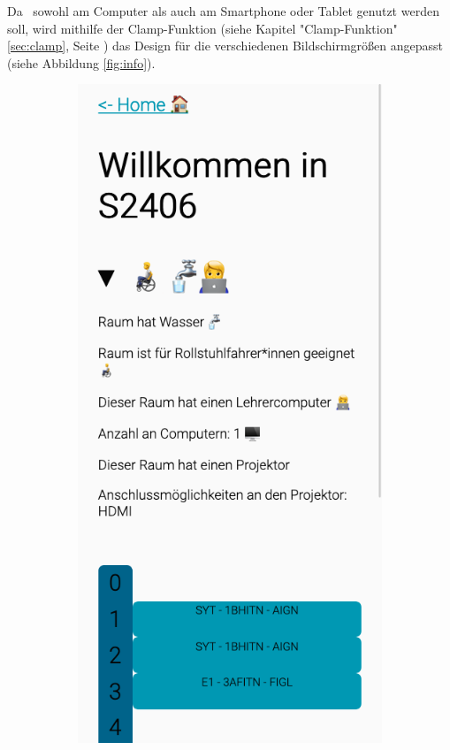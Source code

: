 
\clearpage
{}

Da \ZELIA\ sowohl am Computer als auch am Smartphone oder Tablet genutzt werden soll, wird mithilfe der Clamp-Funktion (siehe Kapitel "Clamp-Funktion" \ref{sec:clamp}, Seite \pageref{sec:clamp}) das Design für die verschiedenen Bildschirmgrößen angepasst (siehe Abbildung \ref{fig:info}).

\begin{figure}[H]
    \begin{subfigure}[b]{0.34\textwidth}
        \centering
        \includegraphics[width=\textwidth]{media/ResponsiveDesign/ZeliaMobile.png}

\end{subfigure}
\end{figure}
